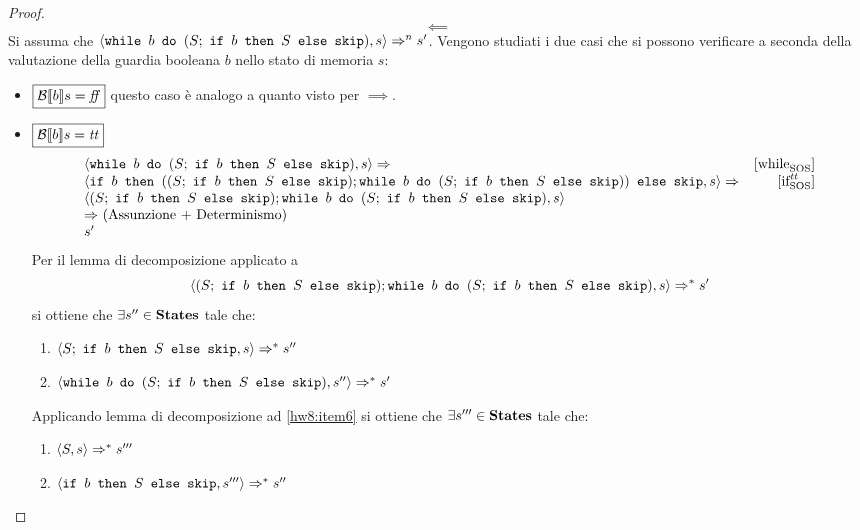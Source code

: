 \begin{proof}

$$
\boxed{\impliedby}
$$
Si assuma che
$\confSs{\wbS{b}{(S;\ \ifABC{b}{S}{\skipForFriends})}}{s} \Rar{n} s'$. Vengono
studiati i due casi che si possono verificare a seconda della valutazione
della guardia booleana $b$ nello stato di memoria $s$:

\begin{itemize}
  \item $\boxed{\B{b} = \semfalse}$ questo caso è analogo a quanto visto per
    $\boxed{\implies}$.
  \item $\boxed{\B{b} = \semtrue}$
  $$
  \begin{array}{lr}
  \confSs{\wbS{b}{(S;\ \ifABC{b}{S}{\skipForFriends})}}{s} \Rar{}& \whileSOS \\
  \confSs{\ifABC{b}
            {((S;\ \ifABC{b}{S}{\skipForFriends});
              \wbS{b}{(S;\ \ifABC{b}{S}{\skipForFriends})})}
            {\skipForFriends}
         }{s} \Rar{ }& \ifttSOS \\
  \confSs{  (S;\ \ifABC{b}{S}{\skipForFriends});
            \wbS{b}{(S;\ \ifABC{b}{S}{\skipForFriends})}
         }{s} \\
  \Rar{ } (\text{Assunzione + Determinismo})\\
  s'
  \end{array}
  $$
  Per il lemma di decomposizione applicato a
  \begin{equation}
  \confSs{  (S;\ \ifABC{b}{S}{\skipForFriends});
            \wbS{b}{(S;\ \ifABC{b}{S}{\skipForFriends})}
         }{s}
    \Rar{*} s'
  \label{eq:hw8:isimpl}
  \end{equation}
  si ottiene che $\exists s'' \in \states$ tale che:
  \begin{enumerate}[label=(\alph*)]
    \item $\confSs{S;\ \ifABC{b}{S}{\skipForFriends}}{s} \Rar{*} s''$
    \label{hw8:item6}
    \item $\confSs{\wbS{b}{(S;\ \ifABC{b}{S}{\skipForFriends})}}{s''}
      \Rar{*} s'$
    \label{hw8:item7}
  \end{enumerate}
  Applicando lemma di decomposizione ad \ref{hw8:item6}
  si ottiene che $\exists{s'''}\in\states$ tale che:
  \begin{enumerate}[label=(\alph*)]
    \item $\confSs{S}{s} \Rar{*} s'''$
    \label{hw8:item8}
    \item $\confSs{\ifABC{b}{S}{\skipForFriends}}{s'''} \Rar{*} s''$
    \label{hw8:item9}
  \end{enumerate}

\end{itemize}
\end{proof}
